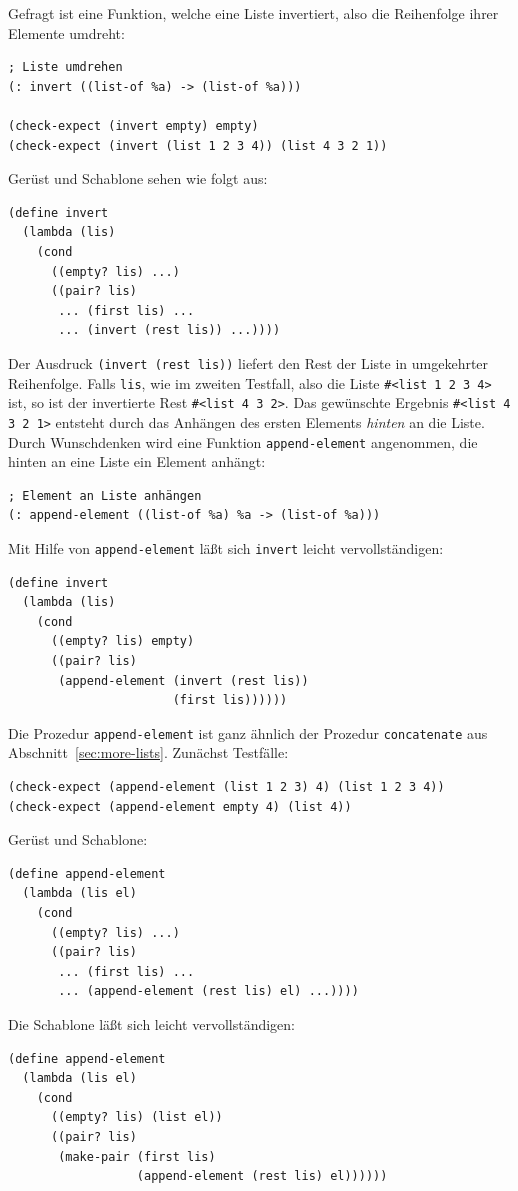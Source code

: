 Gefragt ist eine Funktion, welche eine Liste invertiert, also die
Reihenfolge ihrer Elemente umdreht:\label{sec:invert}
%
\begin{verbatim}
; Liste umdrehen
(: invert ((list-of %a) -> (list-of %a)))

(check-expect (invert empty) empty)
(check-expect (invert (list 1 2 3 4)) (list 4 3 2 1))
\end{verbatim}
%
Gerüst und Schablone sehen wie folgt aus:
%
\begin{verbatim}
(define invert
  (lambda (lis)
    (cond
      ((empty? lis) ...)
      ((pair? lis)
       ... (first lis) ...
       ... (invert (rest lis)) ...))))
\end{verbatim}
%
Der Ausdruck \texttt{(invert (rest lis))} liefert den Rest der Liste
in umgekehrter Reihenfolge.  Falls \texttt{lis}, wie im zweiten
Testfall, also die Liste \verb|#<list 1 2 3 4>| ist, so ist der
invertierte Rest \verb|#<list 4 3 2>|.  Das gewünschte Ergebnis
\verb|#<list 4 3 2 1>| entsteht durch das Anhängen des ersten Elements
\emph{hinten} an die Liste.  Durch Wunschdenken wird eine Funktion
\texttt{append-element}
angenommen, die hinten an eine Liste ein Element anhängt:
%
\begin{verbatim}
; Element an Liste anhängen
(: append-element ((list-of %a) %a -> (list-of %a)))
\end{verbatim}
%
Mit Hilfe von \texttt{append-element} läßt sich \texttt{invert} leicht
vervollständigen:
%
\begin{verbatim}
(define invert
  (lambda (lis)
    (cond
      ((empty? lis) empty)
      ((pair? lis)
       (append-element (invert (rest lis))
                       (first lis))))))
\end{verbatim}
%
Die Prozedur \texttt{append-element} ist ganz ähnlich der Prozedur
\texttt{concatenate} aus Abschnitt~\ref{sec:more-lists}.  Zunächst
Testfälle:
%
\begin{verbatim}
(check-expect (append-element (list 1 2 3) 4) (list 1 2 3 4))
(check-expect (append-element empty 4) (list 4))
\end{verbatim}
%
Gerüst und Schablone:
%
\begin{verbatim}
(define append-element
  (lambda (lis el)
    (cond
      ((empty? lis) ...)
      ((pair? lis)
       ... (first lis) ...
       ... (append-element (rest lis) el) ...))))
\end{verbatim}
%
Die Schablone läßt sich leicht vervollständigen:
%
\begin{verbatim}
(define append-element
  (lambda (lis el)
    (cond
      ((empty? lis) (list el))
      ((pair? lis)
       (make-pair (first lis)
                  (append-element (rest lis) el))))))
\end{verbatim}
